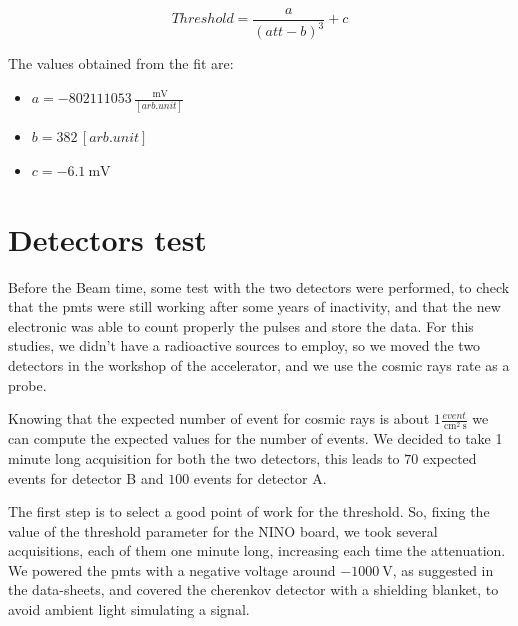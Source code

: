 \begin{equation}
Threshold = \dfrac{a}{(att - b)^{3}} + c
\end{equation}

The values obtained from the fit are:

\begin{itemize}
\item $a = - 802111053 \, \frac{\SI{}{\milli \volt}}{[arb.unit]}$
\item $b = 382 \, [arb. unit]$
\item $c =  \SI{-6.1}{\milli \volt}$
\end{itemize}

\section{Detectors test}

Before the Beam time, some test with the two detectors were performed, to check that the pmts were still working after some years of inactivity, and that the new electronic was able to count properly the pulses and store the data. For this studies, we didn't have a radioactive sources to employ, so we moved the two detectors in the workshop of the accelerator, and we use the cosmic rays rate as a probe. 

Knowing that the expected number of event for cosmic rays is about $1 \frac{event}{\SI{}{\centi \meter\squared} \SI{}{\second}}$ we can compute the expected values for the number of events. We decided to take 1 minute long acquisition for both the two detectors, this leads to $70$ expected events for detector B  and  $100$ events for detector A.  \smallskip

The first step is to select a good point of work for the threshold. So, fixing the value of the threshold parameter for the NINO board, we took several acquisitions, each of them one minute long, increasing each time the attenuation. We powered the pmts with a negative voltage around $ \SI{-1000}{\volt}$, as suggested in the data-sheets, and covered the cherenkov detector with a shielding blanket, to avoid ambient light simulating a signal.

\begin{figure}[hbtp]
\centering
{}
\end{figure}

